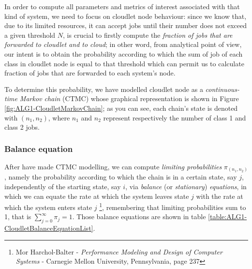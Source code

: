 \documentclass[10pt,a4paper]{article}
\begin{document}
In order to compute all parameters and metrics of interest associated with that kind of system, we need to focus on  cloudlet node behaviour: since we know that, due to its limited resources, it can accept jobs until their number does not exceed a given threshold $N$, is crucial to firstly compute the \textit{fraction of jobs that are forwarded to cloudlet and to cloud}; in other word, from analytical point of view, our intent is to obtain the probability according to which the sum of job of each class in cloudlet node is equal to that threshold which can permit us to calculate fraction of jobs that are forwarded to each system's node.

To determine this probability, we have modelled cloudlet node as a \textit{continuous-time Markov chain} (CTMC) whose graphical representation is shown in Figure \ref{fig:ALG1-CloudletMarkovChain}; as you can see, each chain's state is denoted with $(n_1,n_2)$, where $n_1$ and $n_2$ represent respectively the number of class 1 and class 2 jobs.

\subsubsection{Balance equation} 

After have made CTMC modelling, we can compute \textit{limiting probabilities} $\pi_{(n_1,n_2)}$, namely the probability according to which the chain is in a certain state, say $j$, independently of the starting state, say $i$, via \textit{balance} (or \textit{stationary}) \textit{equations}, in which we can equate the rate at which the system leaves state $j$ with the rate at which the system enters state $j$ \footnote{Mor Harchol-Balter - \textit{Performance Modeling and Design of Computer Systems} - Carnegie Mellon University, Pennsylvania, page 237}, remembering that limiting probabilities sum to 1, that is $\sum_{j=0}^\infty \pi_j = 1$. Those balance equations are shown in table \ref{table:ALG1-CloudletBalanceEquationList}.
\end{document}
